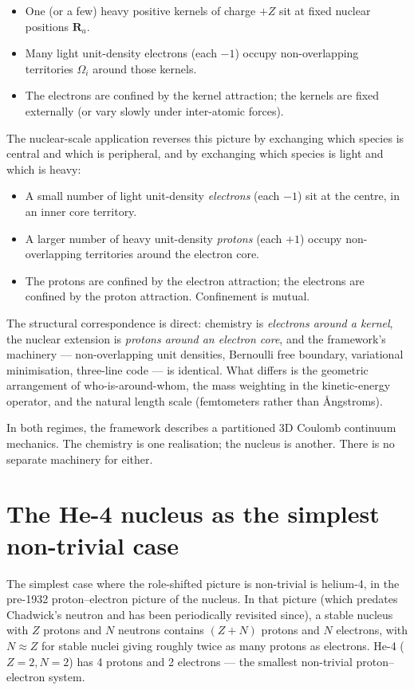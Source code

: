 \begin{itemize}
\item One (or a few) heavy positive kernels of charge $+Z$ sit at fixed nuclear positions $\mathbf{R}_a$.
\item Many light unit-density electrons (each $-1$) occupy non-overlapping territories $\Omega_i$ around those kernels.
\item The electrons are confined by the kernel attraction; the kernels are fixed externally (or vary slowly under inter-atomic forces).
\end{itemize}

The nuclear-scale application reverses this picture by exchanging which species is central and which is peripheral, and by exchanging which species is light and which is heavy:

\begin{itemize}
\item A small number of light unit-density \emph{electrons} (each $-1$) sit at the centre, in an inner core territory.
\item A larger number of heavy unit-density \emph{protons} (each $+1$) occupy non-overlapping territories around the electron core.
\item The protons are confined by the electron attraction; the electrons are confined by the proton attraction. Confinement is mutual.
\end{itemize}

The structural correspondence is direct: chemistry is \emph{electrons around a kernel}, the nuclear extension is \emph{protons around an electron core}, and the framework's machinery --- non-overlapping unit densities, Bernoulli free boundary, variational minimisation, three-line code --- is identical. What differs is the geometric arrangement of who-is-around-whom, the mass weighting in the kinetic-energy operator, and the natural length scale (femtometers rather than \AA{}ngstroms).

In both regimes, the framework describes a partitioned 3D Coulomb continuum mechanics. The chemistry is one realisation; the nucleus is another. There is no separate machinery for either.

\section{The He-4 nucleus as the simplest non-trivial case}\label{sec:he4-natural}

The simplest case where the role-shifted picture is non-trivial is helium-4, in the pre-1932 proton--electron picture of the nucleus. In that picture (which predates Chadwick's neutron and has been periodically revisited since), a stable nucleus with $Z$ protons and $N$ neutrons contains $(Z+N)$ protons and $N$ electrons, with $N \approx Z$ for stable nuclei giving roughly twice as many protons as electrons. He-4 ($Z=2, N=2$) has 4 protons and 2 electrons --- the smallest non-trivial proton--electron system.

